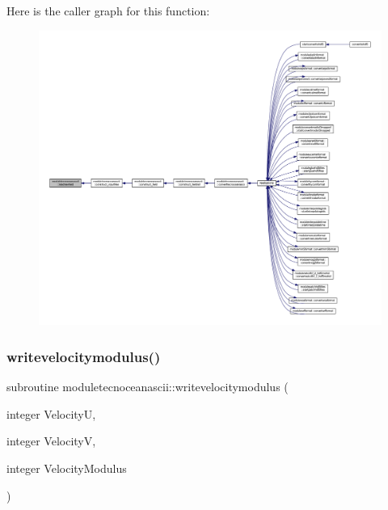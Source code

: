 Here is the caller graph for this function\+:\nopagebreak
\begin{figure}[H]
\begin{center}
\leavevmode
\includegraphics[width=350pt]{namespacemoduletecnoceanascii_a3a6fefcdee1dbb139d00be33aaf2e48f_icgraph}
\end{center}
\end{figure}
\mbox{\label{namespacemoduletecnoceanascii_aa4e611e7a40208b6cd2a72c6a6ee06f7}} 
\subsubsection{\texorpdfstring{writevelocitymodulus()}{writevelocitymodulus()}}
{\footnotesize\ttfamily subroutine moduletecnoceanascii\+::writevelocitymodulus (\begin{DoxyParamCaption}\item[{integer}]{VelocityU,  }\item[{integer}]{VelocityV,  }\item[{integer}]{Velocity\+Modulus }\end{DoxyParamCaption})\hspace{0.3cm}{\ttfamily [private]}}


